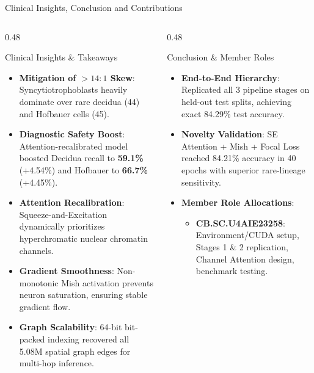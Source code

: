 \documentclass[aspectratio=169, 10pt]{beamer}
\begin{document}
\begin{frame}{Clinical Insights, Conclusion and Contributions}
\begin{columns}[onlytextwidth, t]
  \begin{column}{0.48\textwidth}
    \begin{block}{Clinical Insights \& Takeaways}
      \begin{itemize}\scriptsize
        \item \textbf{Mitigation of $>14:1$ Skew}: Syncytiotrophoblasts heavily dominate over rare decidua (44) and Hofbauer cells (45).
        \item \textbf{Diagnostic Safety Boost}: Attention-recalibrated model boosted Decidua recall to \textbf{59.1\%} (+4.54\%) and Hofbauer to \textbf{66.7\%} (+4.45\%).
        \item \textbf{Attention Recalibration}: Squeeze-and-Excitation dynamically prioritizes hyperchromatic nuclear chromatin channels.
        \item \textbf{Gradient Smoothness}: Non-monotonic Mish activation prevents neuron saturation, ensuring stable gradient flow.
        \item \textbf{Graph Scalability}: 64-bit bit-packed indexing recovered all 5.08M spatial graph edges for multi-hop inference.
      \end{itemize}
    \end{block}
  \end{column}
  \hfill
  \begin{column}{0.48\textwidth}
    \begin{exampleblock}{Conclusion \& Member Roles}
      \begin{itemize}\scriptsize
        \item \textbf{End-to-End Hierarchy}: Replicated all 3 pipeline stages on held-out test splits, achieving exact 84.29\% test accuracy.
        \item \textbf{Novelty Validation}: SE Attention + Mish + Focal Loss reached 84.21\% accuracy in 40 epochs with superior rare-lineage sensitivity.
        \item \textbf{Member Role Allocations}:
          \begin{itemize}\scriptsize
            \item \textbf{CB.SC.U4AIE23258}: Environment/CUDA setup, Stages 1 \& 2 replication, Channel Attention design, benchmark testing.

\end{itemize}
\end{itemize}
\end{exampleblock}
\end{column}
\end{columns}
\end{frame}
\end{document}

